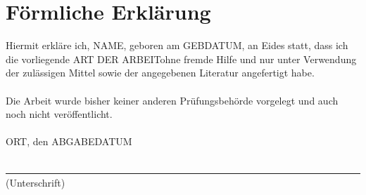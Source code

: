 %
%
%
%

\section*{Förmliche Erklärung}
Hiermit erkläre ich, \lbrack NAME\rbrack , geboren am \lbrack GEBDATUM\rbrack , an Eides statt, dass ich die vorliegende \lbrack ART DER ARBEIT\rbrack ohne fremde Hilfe und nur unter Verwendung der zulässigen Mittel sowie der angegebenen Literatur angefertigt habe.
\\
\\
Die Arbeit wurde bisher keiner anderen Prüfungsbehörde vorgelegt und auch noch
nicht veröffentlicht.
\\
\vspace*{4.5cm}
\\

\noindent \lbrack ORT\rbrack , den \lbrack ABGABEDATUM\rbrack
\\
\vspace*{3.5cm}\\
\underline{~~~~~~~~~~~~~~~~~~~~~~~~~~~~~~~~~~~~~~~~~~~~~~~~~~~~~~~~~~~~~~~~~~~~~~~~}\\(Unterschrift)
\normalsize


